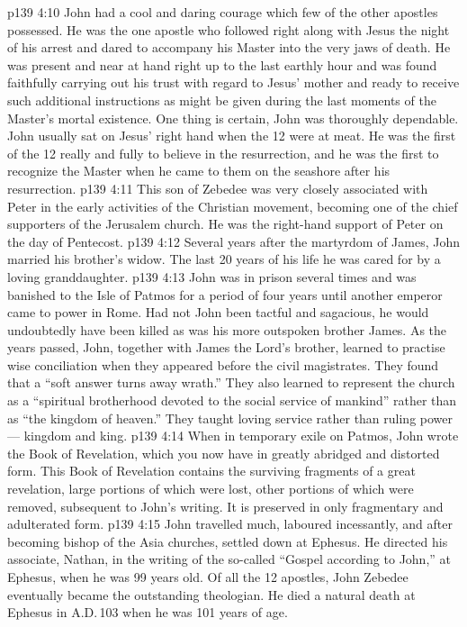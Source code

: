 \vs p139 4:10 John had a cool and daring courage which few of the other apostles possessed. He was the one apostle who followed right along with Jesus the night of his arrest and dared to accompany his Master into the very jaws of death. He was present and near at hand right up to the last earthly hour and was found faithfully carrying out his trust with regard to Jesus’ mother and ready to receive such additional instructions as might be given during the last moments of the Master’s mortal existence. One thing is certain, John was thoroughly dependable. John usually sat on Jesus’ right hand when the 12 were at meat. He was the first of the 12 really and fully to believe in the resurrection, and he was the first to recognize the Master when he came to them on the seashore after his resurrection.
\vs p139 4:11 This son of Zebedee was very closely associated with Peter in the early activities of the Christian movement, becoming one of the chief supporters of the Jerusalem church. He was the right\hyp{}hand support of Peter on the day of Pentecost.
\vs p139 4:12 Several years after the martyrdom of James, John married his brother’s widow. The last 20 years of his life he was cared for by a loving granddaughter.
\vs p139 4:13 John was in prison several times and was banished to the Isle of Patmos for a period of four years until another emperor came to power in Rome. Had not John been tactful and sagacious, he would undoubtedly have been killed as was his more outspoken brother James. As the years passed, John, together with James the Lord’s brother, learned to practise wise conciliation when they appeared before the civil magistrates. They found that a “soft answer turns away wrath.” They also learned to represent the church as a “spiritual brotherhood devoted to the social service of mankind” rather than as “the kingdom of heaven.” They taught loving service rather than ruling power --- kingdom and king.
\vs p139 4:14 When in temporary exile on Patmos, John wrote the Book of Revelation, which you now have in greatly abridged and distorted form. This Book of Revelation contains the surviving fragments of a great revelation, large portions of which were lost, other portions of which were removed, subsequent to John’s writing. It is preserved in only fragmentary and adulterated form.
\vs p139 4:15 John travelled much, laboured incessantly, and after becoming bishop of the Asia churches, settled down at Ephesus. He directed his associate, Nathan, in the writing of the so\hyp{}called “Gospel according to John,” at Ephesus, when he was 99 years old. Of all the 12 apostles, John Zebedee eventually became the outstanding theologian. He died a natural death at Ephesus in A.D.\,103 when he was 101 years of age.
